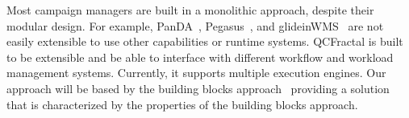 Most campaign managers are built in a monolithic approach, despite their modular design.
For example, PanDA~\cite{maeno2008panda}, Pegasus~\cite{deelman2015pegasus}, and glideinWMS~\cite{sfiligoi2008glidein} are not easily extensible to use other capabilities or runtime systems.
QCFractal is built to be extensible and be able to interface with different workflow and workload management systems. Currently, it supports multiple execution engines.
Our approach will be based by the building blocks approach~\cite{turilli2019middleware} providing a solution that is characterized by the properties of the building blocks approach.